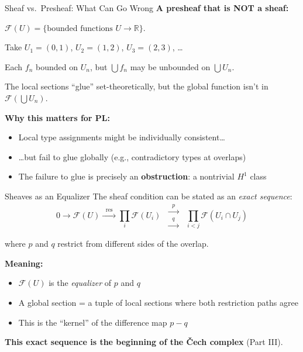 \documentclass[aspectratio=169,10pt]{beamer}
\newcommand{\Fscr}{\mathcal{F}}
\begin{document}
\begin{frame}{Sheaf vs.\ Presheaf: What Can Go Wrong}
\textbf{A presheaf that is NOT a sheaf:}

$\Fscr(U) = \{\text{bounded functions } U \to \mathbb{R}\}$.

Take $U_1 = (0, 1)$, $U_2 = (1, 2)$, $U_3 = (2, 3)$, \ldots

Each $f_n$ bounded on $U_n$, but $\bigcup f_n$ may be unbounded on $\bigcup U_n$.

The local sections ``glue'' set-theoretically, but the global function isn't in $\Fscr(\bigcup U_n)$.

\vspace{0.5em}
\textbf{Why this matters for PL:}
\begin{itemize}
  \item Local type assignments might be individually consistent\ldots
  \item \ldots but fail to glue globally (e.g., contradictory types at overlaps)
  \item The failure to glue is precisely an \textbf{obstruction}: a nontrivial $H^1$ class
\end{itemize}
\end{frame}

\begin{frame}{Sheaves as an Equalizer}
The sheaf condition can be stated as an \emph{exact sequence}:
\[
0 \to \Fscr(U) \xrightarrow{\;\;\text{res}\;\;}
\prod_i \Fscr(U_i) \;\;
\substack{\xrightarrow{\;\;p\;\;} \\ \xrightarrow{\;\;q\;\;}}
\;\; \prod_{i < j} \Fscr(U_i \cap U_j)
\]

where $p$ and $q$ restrict from different sides of the overlap.

\vspace{0.3em}
\textbf{Meaning:}
\begin{itemize}
  \item $\Fscr(U)$ is the \emph{equalizer} of $p$ and $q$
  \item A global section = a tuple of local sections where both restriction paths agree
  \item This is the ``kernel'' of the difference map $p - q$
\end{itemize}

\textbf{This exact sequence is the beginning of the \v{C}ech complex} (Part III).
\end{frame}
\end{document}
